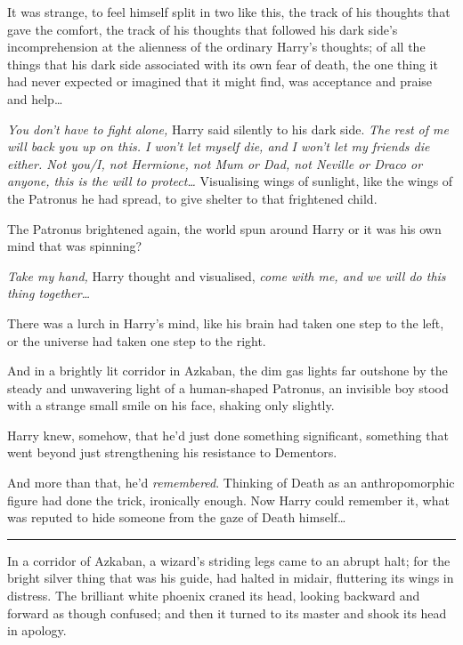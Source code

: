 It was strange, to feel himself split in two like this, the track of his
thoughts that gave the comfort, the track of his thoughts that followed
his dark side's incomprehension at the alienness of the ordinary Harry's
thoughts; of all the things that his dark side associated with its own
fear of death, the one thing it had never expected or imagined that it
might find, was acceptance and praise and help\ldots{}

\emph{You don't have to fight alone,} Harry said silently to his dark
side. \emph{The rest of me will back you up on this. I won't let myself
die, and I won't let my friends die either. Not you/I, not Hermione, not
Mum or Dad, not Neville or Draco or anyone, this is the will to
protect\ldots{}} Visualising wings of sunlight, like the wings of the
Patronus he had spread, to give shelter to that frightened child.

The Patronus brightened again, the world spun around Harry or it was his
own mind that was spinning?

\emph{Take my hand,} Harry thought and visualised, \emph{come with me,
and we will do this thing together\ldots{}}

There was a lurch in Harry's mind, like his brain had taken one step to
the left, or the universe had taken one step to the right.

And in a brightly lit corridor in Azkaban, the dim gas lights far
outshone by the steady and unwavering light of a human-shaped Patronus,
an invisible boy stood with a strange small smile on his face, shaking
only slightly.

Harry knew, somehow, that he'd just done something significant,
something that went beyond just strengthening his resistance to
Dementors.

And more than that, he'd \emph{remembered}. Thinking of Death as an
anthropomorphic figure had done the trick, ironically enough. Now Harry
could remember it, what was reputed to hide someone from the gaze of
Death himself\ldots{}

\begin{center}\rule{3in}{0.4pt}\end{center}

In a corridor of Azkaban, a wizard's striding legs came to an abrupt
halt; for the bright silver thing that was his guide, had halted in
midair, fluttering its wings in distress. The brilliant white phoenix
craned its head, looking backward and forward as though confused; and
then it turned to its master and shook its head in apology.

